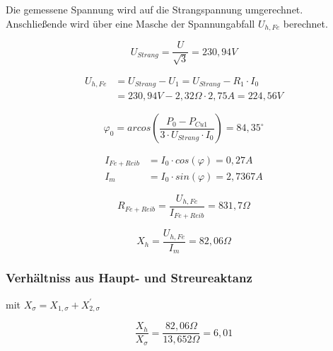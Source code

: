 \documentclass[conference]{IEEEtran}
\begin{document}
Die gemessene Spannung wird auf die Strangspannung umgerechnet.
Anschließende wird über eine Masche der Spannungabfall $U_{h, Fe}$
berechnet.

\begin{equation}
    U_{Strang} = \dfrac{U}{ \sqrt{3} } = 230,94\si{V}
\end{equation}

\begin{align} \label{eq:UhFe}
    U_{h, Fe} & = U_{Strang} - U_{1} = U_{Strang} - R_{1} \cdot I_{0} \\
              & = 230,94\si{V} - 2,32 \Omega \cdot 2,75\si{A} = 224,56\si{V}
\end{align}


\begin{equation}
    \varphi_{0} = arcos\left( \dfrac{P_{0} - P_{Cu1} }{3 \cdot U_{Strang} \cdot I_{0} }\right) = 84,35^\circ
\end{equation}


\begin{align*}
    I_{Fe+Reib} & = I_{0} \cdot cos( \varphi ) = 0,27\si{A}   \\
    I_{m}       & = I_{0} \cdot sin( \varphi ) = 2,7367\si{A}
\end{align*}

\begin{equation}
    R_{Fe+Reib} = \dfrac{ U_{h, Fe} }{ I_{Fe+Reib} } = 831,7 \Omega
\end{equation}

\begin{equation}
    X_{h} = \dfrac{ U_{h, Fe} }{ I_{m} } = 82,06 \Omega
\end{equation}

\subsubsection{Verhältniss aus Haupt- und Streureaktanz}

mit $X_{ \sigma } =  X_{1, \sigma } + X_{2, \sigma }^\prime$

\begin{equation}
    \dfrac{ X_{h}}{X_{ \sigma }} = \dfrac{ 82,06 \Omega }{ 13,652 \Omega } = 6,01
\end{equation}
\end{document}
